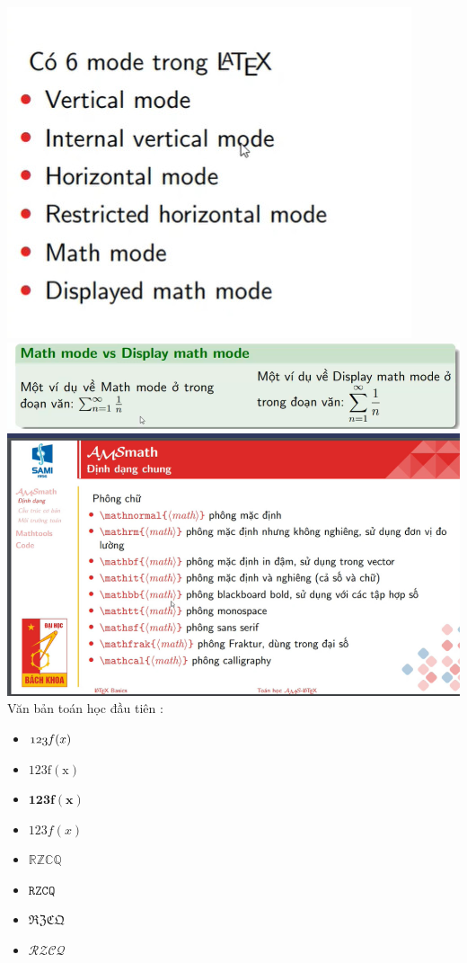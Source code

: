 \documentclass{article}
\begin{document}
\includegraphics[scale=0.6]{image/latex-mode.jpg}\\
\includegraphics[scale=0.3]{image/math-mode.jpg}\\
\includegraphics[scale=0.6]{image/dinh-dang-chung.png}\\
Văn bản toán học đầu tiên : 
\begin{itemize}
	\item $\mathnormal{123 f(x)}$
	\item $\mathrm{123 f(x)}$
	\item $\mathbf{123 f(x)}$
	\item $\mathit{123 f(x)}$
	\item $\mathbb{R Z C Q}$
	\item $\mathtt{R Z C Q}$
	\item $\mathfrak{R Z C Q}$
	\item $\mathcal{R Z C Q}$
\end{itemize}
\end{document}
